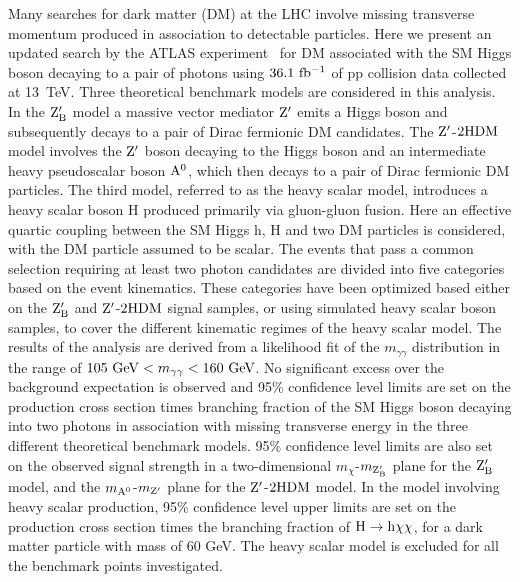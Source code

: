 \documentclass[10pt]{article}
\begin{document}
Many searches for dark matter (DM) at the LHC involve missing transverse momentum
produced in association to detectable particles. Here we present an updated search
by the ATLAS experiment~\cite{ATLAS-twophoton-BSM} for DM associated with the SM
Higgs boson decaying to a pair of photons using $36.1~{\rm fb^{-1}}$ of pp
collision data collected at 13~TeV. Three theoretical benchmark models are
considered in this analysis. In the ${\rm Z_{B}'}$ model a massive vector
mediator ${\rm Z'}$ emits a Higgs boson and subsequently decays to a pair of Dirac
fermionic DM candidates.
The ${\rm Z'}$-${\rm 2HDM}$ model involves the ${\rm Z'}$ boson decaying
to the Higgs boson and an intermediate heavy pseudoscalar boson ${\rm A^{0}}$,
which then decays to a pair of Dirac fermionic DM particles. The third model,
referred to as the heavy scalar model, introduces a heavy scalar boson H
produced primarily via gluon-gluon fusion. Here an effective quartic coupling
between the SM Higgs h, H and two DM particles is considered, with the DM
particle assumed to be scalar. The events that pass a common selection requiring
at least two photon candidates are divided into five categories based on the
event kinematics. These categories have been optimized based either on the ${\rm Z_{B}'}$
and ${\rm Z'}$-${\rm 2HDM}$ signal samples, or using simulated heavy scalar
boson samples, to cover the different kinematic regimes of the heavy scalar
model. The results of the analysis are derived from a likelihood fit of the
$m_{\gamma\gamma}$ distribution in the range of
$105~{\rm GeV} < m_{\gamma\gamma} < 160~{\rm GeV}$.
No significant excess over
the background expectation is observed and 95\% confidence level limits are set
on the production cross section times branching fraction of the SM Higgs boson
decaying into two photons in association with missing transverse energy in the
three different theoretical benchmark models. 95\% confidence level limits are
also set on the observed signal strength in a two-dimensional
$m_{\chi}$-$m_{\rm Z_{B}'}$ plane for the ${\rm Z_{B}'}$ model, and the
$m_{\rm A^0}$-$m_{\rm Z'}$ plane for the ${\rm Z'}$-${\rm 2HDM}$ model. In the
model involving heavy scalar production, 95\% confidence level upper limits are
set on the production cross section times the branching fraction of
${\rm H}\to{\rm h}\chi\chi$, for a dark matter
particle with mass of 60 GeV. The heavy scalar model is excluded for all the
benchmark points investigated.
\end{document}
